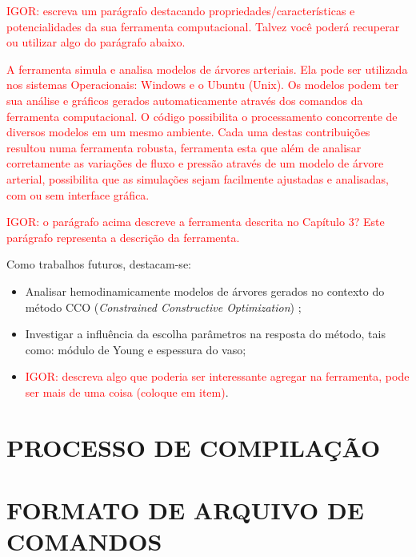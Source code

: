 \documentclass[
        english,			
        brazil			        %
        ,<...>]{abntbibufjf}
\begin{document}
\textcolor{red}{IGOR: escreva um parágrafo destacando propriedades/características e potencialidades da sua ferramenta computacional. Talvez você poderá recuperar ou utilizar algo do parágrafo abaixo.}

\textcolor{red}{A ferramenta simula e analisa modelos de árvores arteriais. Ela pode ser utilizada nos sistemas Operacionais: Windows e o Ubuntu (Unix). Os modelos podem ter sua análise e gráficos gerados automaticamente através dos comandos da ferramenta computacional. O código possibilita o processamento concorrente de diversos modelos em um mesmo ambiente. Cada uma destas contribuições resultou numa ferramenta robusta,  ferramenta esta que além de analisar corretamente as variações de fluxo e pressão através de um modelo de árvore arterial, possibilita que as simulações sejam facilmente ajustadas e analisadas, com ou sem interface gráfica.}

\textcolor{red}{IGOR: o parágrafo acima descreve a ferramenta descrita no Capítulo 3? Este parágrafo representa a descrição da ferramenta.}

Como trabalhos futuros, destacam-se:
\begin{itemize}
    \item Analisar hemodinamicamente modelos de árvores gerados no contexto do método CCO (\emph{Constrained Constructive Optimization}) \cite{Karch1999,Queiroz2013,Queiroz2015,Brito2017};
    \item Investigar a influência da escolha parâmetros na resposta do método, tais como: módulo de Young e espessura do vaso;
    \item \textcolor{red} {IGOR: descreva algo que poderia ser interessante agregar na ferramenta, pode ser mais de uma coisa (coloque em item)}.
\end{itemize}

\begin{appendices}
	\chapter{PROCESSO DE COMPILAÇÃO}\label{annex1}
	
	
	\chapter{FORMATO DE ARQUIVO DE COMANDOS}\label{annex2}
	
	
	
	
\end{appendices}



\end{document}
